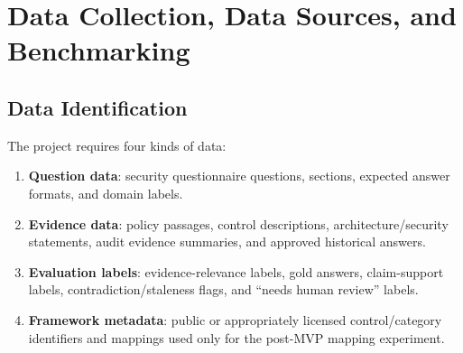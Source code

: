 \documentclass[11pt,journal,onecolumn]{IEEEtran}
\begin{document}
\section{Data Collection, Data Sources, and Benchmarking}

\subsection{Data Identification}
The project requires four kinds of data:
\begin{enumerate}[leftmargin=1.7em]
    \item \textbf{Question data}: security questionnaire questions, sections, expected answer formats, and domain labels.
    \item \textbf{Evidence data}: policy passages, control descriptions, architecture/security statements, audit evidence summaries, and approved historical answers.
    \item \textbf{Evaluation labels}: evidence-relevance labels, gold answers, claim-support labels, contradiction/staleness flags, and ``needs human review'' labels.
    \item \textbf{Framework metadata}: public or appropriately licensed control/category identifiers and mappings used only for the post-MVP mapping experiment.
\end{enumerate}
\end{document}
